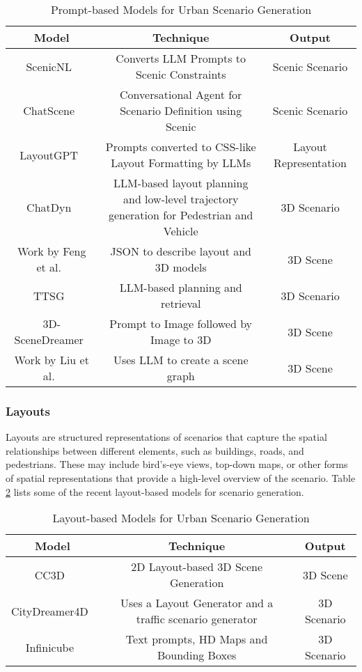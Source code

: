 \documentclass{article}
\begin{document}
\begin{table}[ht]
\centering
    \begin{tabular}{|c|c|c|}
    \hline
    \textbf{Model} & \textbf{Technique} & \textbf{Output} \\ \hline
    ScenicNL~\cite{elmaaroufi2024scenicnl} & Converts LLM Prompts to Scenic Constraints & Scenic Scenario \\ \hline
    ChatScene~\cite{zhang2024chatscene} & Conversational Agent for Scenario Definition using Scenic & Scenic Scenario \\ \hline
    LayoutGPT~\cite{feng2023layoutgpt} & Prompts converted to CSS-like Layout Formatting by LLMs & Layout Representation \\ \hline
    ChatDyn~\cite{wei2024chatdyn} & LLM-based layout planning and low-level trajectory generation for Pedestrian and Vehicle & 3D Scenario \\ \hline
    Work by Feng et al.~\cite{feng2025text} & JSON to describe layout and 3D models & 3D Scene \\ \hline
    TTSG~\cite{ruan2024traffic} & LLM-based planning and retrieval & 3D Scenario \\ \hline
    3D-SceneDreamer~\cite{zhang20243d} & Prompt to Image followed by Image to 3D & 3D Scene \\ \hline
    Work by Liu et al.~\cite{liu2024graph} & Uses LLM to create a scene graph & 3D Scene \\ \hline
    \end{tabular}
\caption{Prompt-based Models for Urban Scenario Generation}
\label{tab:prompt_based_models}
\end{table}

\subsubsection{Layouts}

Layouts are structured representations of scenarios that capture the spatial relationships between different elements, such as buildings, roads, and pedestrians. These may include bird's-eye views, top-down maps, or other forms of spatial representations that provide a high-level overview of the scenario. Table \ref{tab:layout_based_models} lists some of the recent layout-based models for scenario generation.

\begin{table}[ht]
\centering
    \begin{tabular}{|c|c|c|}
    \hline
    \textbf{Model} & \textbf{Technique} & \textbf{Output} \\ \hline
    CC3D~\cite{bahmani2023cc3d} & 2D Layout-based 3D Scene Generation & 3D Scene \\ \hline
    CityDreamer4D~\cite{xie2025citydreamer4d} & Uses a Layout Generator and a traffic scenario generator & 3D Scenario \\ \hline
    Infinicube~\cite{lu2024infinicube} & Text prompts, HD Maps and Bounding Boxes & 3D Scenario \\ \hline
    \end{tabular}
\caption{Layout-based Models for Urban Scenario Generation}
\label{tab:layout_based_models}
\end{table}
\end{document}
